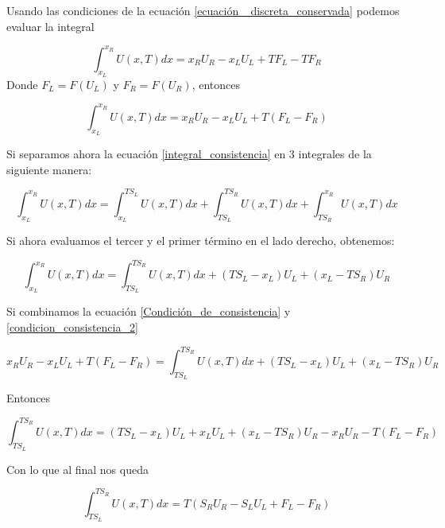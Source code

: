 \documentclass[12pt,a4paper]{book}
\begin{document}
Usando las condiciones de la ecuación \ref{ecuación  _discreta_conservada} podemos evaluar la integral

\begin{equation*}
\int_{x_L}^{x_R} U\left( x, T \right) dx = 
x_R U_R -x_L U_L+T F_L-T F_R
\end{equation*}
Donde $F_L = F \left( U_L \right)$ y $F_R = F \left( U_R \right)$, entonces

\begin{equation}\label{Condición_de_consistencia}
\int_{x_L}^{x_R} U\left( x, T \right) dx = 
x_R U_R -x_L U_L+T \left( F_L- F_R \right)
\end{equation}

Si separamos ahora la ecuación \ref{integral_consistencia} en 3 integrales de la siguiente manera:

\begin{equation}
\int_{x_L}^{x_R} U\left( x, T \right) dx = 
\int_{x_L}^{T S_L} U \left(x, T \right)dx+
\int_{T S_L}^{T S_R} U \left(x, T \right)dx+
\int_{T S_R}^{x_R} U \left(x, T \right)dx
\end{equation}

Si ahora evaluamos el tercer y el primer término en el lado derecho, obtenemos:

\begin{equation}\label{condicion_consistencia_2}
\int_{x_L}^{x_R} U\left( x, T \right) dx =
\int_{T S_L}^{T S_R} U \left(x, T \right)dx+
\left( T S_L - x_L \right) U_L+
\left( x_L - T S_R \right) U_R
\end{equation}

Si combinamos la ecuación \ref{Condición_de_consistencia} y 
\ref{condicion_consistencia_2}

\begin{equation*}
x_R U_R -x_L U_L+T \left( F_L- F_R \right) =
\int_{T S_L}^{T S_R} U \left(x, T \right)dx+
\left( T S_L - x_L \right) U_L+
\left( x_L - T S_R \right) U_R
\end{equation*}

Entonces 

\begin{equation*}
\int_{T S_L}^{T S_R} U \left(x, T \right)dx=
\left( T S_L - x_L \right) U_L+ x_L U_L +
\left( x_L - T S_R \right) U_R-x_R U_R -
T \left( F_L- F_R \right)
\end{equation*}

Con lo que al final nos queda

\begin{equation} \label{ull_sin_promedio}
\int_{T S_L}^{T S_R} U \left(x, T \right)dx=
T \left( S_R U_R - S_L U_L + F_L - F_R \right)
\end{equation}
\end{document}
